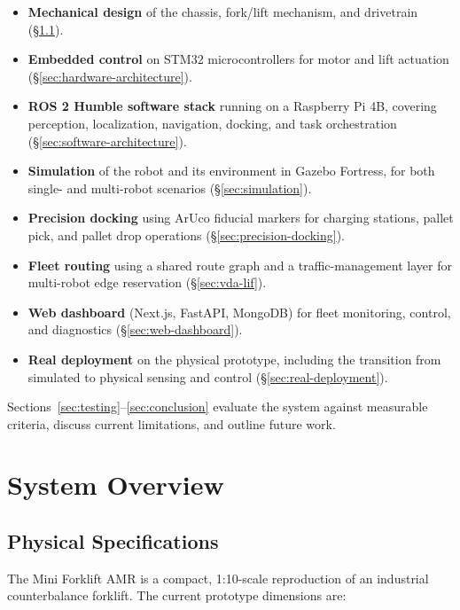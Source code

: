 \documentclass[a4paper, 12pt]{article}
\begin{document}
\begin{itemize}
    \item \textbf{Mechanical design} of the chassis, fork/lift
    mechanism, and drivetrain (\S\ref{sec:physical-specs}).
    \item \textbf{Embedded control} on STM32 microcontrollers for motor
    and lift actuation (\S\ref{sec:hardware-architecture}).
    \item \textbf{ROS 2 Humble software stack} running on a Raspberry Pi
    4B, covering perception, localization, navigation, docking, and task
    orchestration (\S\ref{sec:software-architecture}).
    \item \textbf{Simulation} of the robot and its environment in
    Gazebo Fortress, for both single- and multi-robot scenarios
    (\S\ref{sec:simulation}).
    \item \textbf{Precision docking} using ArUco fiducial markers for
    charging stations, pallet pick, and pallet drop operations
    (\S\ref{sec:precision-docking}).
    \item \textbf{Fleet routing} using a shared route graph and a
    traffic-management layer for multi-robot edge reservation
    (\S\ref{sec:vda-lif}).
    \item \textbf{Web dashboard} (Next.js, FastAPI, MongoDB) for fleet
    monitoring, control, and diagnostics (\S\ref{sec:web-dashboard}).
    \item \textbf{Real deployment} on the physical prototype, including
    the transition from simulated to physical sensing and control
    (\S\ref{sec:real-deployment}).
\end{itemize}

Sections~\ref{sec:testing}--\ref{sec:conclusion} evaluate the system
against measurable criteria, discuss current limitations, and outline
future work.

\section{System Overview}

\subsection{Physical Specifications}
\label{sec:physical-specs}

The Mini Forklift AMR is a compact, 1:10-scale reproduction of an
industrial counterbalance forklift. The current prototype dimensions are:
\end{document}
